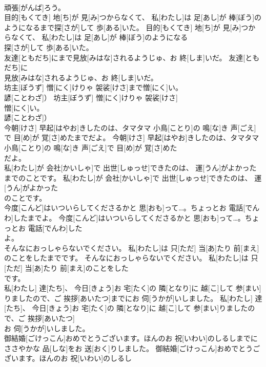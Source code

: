 \documentclass[8pt]{extreport}
\begin{document}
\begin{CJK}{UTF8}{min}
\\	頑張[がんば]ろう。	
\\	目的[もくてき] 地[ち]が 見[み]つからなくて、 私[わたし]は 足[あし]が 棒[ぼう]のようになるまで探[さが]して 歩[ある]いた。	目的[もくてき] 地[ち]が 見[み]つからなくて、 私[わたし]は 足[あし]が 棒[ぼう]のようになる
\\	探[さが]して 歩[ある]いた。	
\\	友達[ともだち]にまで見放[みはな]されるようじゅ、お 終[しま]いだ。	友達[ともだち]に
\\	見放[みはな]されるようじゅ、お 終[しま]いだ。	
\\	坊主[ぼうず] 憎[にく]けりゃ 袈裟[けさ]まで憎[にく]い。
\\	諺[ことわざ]）	坊主[ぼうず] 憎[にく]けりゃ 袈裟[けさ]
\\	憎[にく]い。
\\	諺[ことわざ]）	
\\	今朝[けさ] 早起[はやお]きしたのは、タマタマ 小鳥[ことり]の 鳴[な]き 声[ごえ]で 目[め]が 覚[さ]めたまでだよ。	今朝[けさ] 早起[はやお]きしたのは、タマタマ 小鳥[ことり]の 鳴[な]き 声[ごえ]で 目[め]が 覚[さ]めた
\\	だよ。	
\\	私[わたし]が 会社[かいしゃ]で 出世[しゅっせ]できたのは、 運[うん]がよかったまでのことです。	私[わたし]が 会社[かいしゃ]で 出世[しゅっせ]できたのは、 運[うん]がよかった
\\	のことです。	
\\	今度[こんど]はいついらしてくださるかと 思[おも]って…。ちょっとお 電話[でんわ]したまでよ。	今度[こんど]はいついらしてくださるかと 思[おも]って…。ちょっとお 電話[でんわ]した
\\	よ。	
\\	そんなにおっしゃらないでください。 私[わたし]は 只[ただ] 当[あ]たり 前[まえ]のことをしたまでです。	そんなにおっしゃらないでください。 私[わたし]は 只[ただ] 当[あ]たり 前[まえ]のことをした
\\	です。	
\\	私[わたし] 達[たち]、 今日[きょう]お 宅[たく]の 隣[となり]に 越[こ]して 参[まい]りましたので、ご 挨拶[あいたつ]までにお 伺[うかが]いしました。	私[わたし] 達[たち]、 今日[きょう]お 宅[たく]の 隣[となり]に 越[こ]して 参[まい]りましたので、ご 挨拶[あいたつ]
\\	お 伺[うかが]いしました。	
\\	御結婚[ごけっこん]おめでとうございます。ほんのお 祝[いわい]のしるしまでにささやかな 品[しな]をお 送[おく]りしました。	御結婚[ごけっこん]おめでとうございます。ほんのお 祝[いわい]のしるし

\end{CJK}
\end{document}
